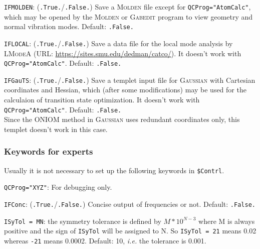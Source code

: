 \documentclass[12pt,english]{extarticle}
\begin{document}
\bigskip{}\bigskip{}
\verb|IFMOLDEN|: (\verb|.True.|/\verb|.False.|) Save a \textsc{Molden} file except for \verb|QCProg="AtomCalc"|, which may be opened by the \textsc{Molden} or \textsc{Gabedit} program to view geometry and normal vibration modes. Default: \verb|.False.|

\bigskip{}\bigskip{}
\verb|IFLOCAL|: (\verb|.True.|/\verb|.False.|) Save a data file for the local mode analysis by \textsc{LModeA} (URL: \href{https://sites.smu.edu/dedman/catco/}{https://sites.smu.edu/dedman/catco/}). It doesn't work with \verb|QCProg="AtomCalc"|. Default: \verb|.False.|

\bigskip{}\bigskip{}
\verb|IFGauTS|: (\verb|.True.|/\verb|.False.|) Save a templet input file for \textsc{Gaussian} with Cartesian coordinates and Hessian, which (after some modifications) may be used for the calculaion of transition state optimization. It doesn't work with \verb|QCProg="AtomCalc"|. Default: \verb|.False.| \\
Since the ONIOM method in \textsc{Gaussian} uses redundant coordinates only, this templet doesn't work in this case.

\subsubsection{Keywords for experts} \label{subsec:inp-qcdata-expert}

Usually it is not necessary to set up the following keywords in \texttt{\$Contrl}.

\bigskip{}\bigskip{}
\verb|QCProg="XYZ"|: For debugging only.

\bigskip{}\bigskip{}
\verb|IFConc|: (\verb|.True.|/\verb|.False.|) Concise output of frequencies or not. Default: \verb|.False.|

\bigskip{}\bigskip{}
\verb|ISyTol = MN|: the symmetry tolerance is defined by $M*10^{N-3}$ where M
is always positive and the sign of \verb|ISyTol| will be assigned to N. So
\verb|ISyTol = 21| means 0.02 whereas \verb|-21| means 0.0002. Default: 10, \emph{i.e.} the tolerance is 0.001.
\end{document}
